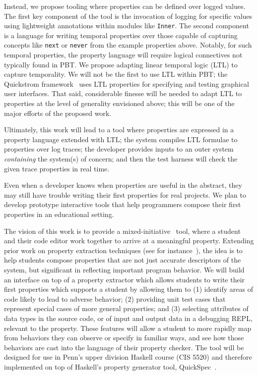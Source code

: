 Instead, we propose tooling where properties can be defined over logged values.
The first key component of the tool is the invocation of
logging for specific values using lightweight annotations within modules like
\lstinline{Inner}. The second component is a language for writing temporal
properties over those capable of capturing concepts like \lstinline{next} or
\lstinline{never} from the example properties above. Notably, for such temporal
properties, the property language will require logical connectives not typically
found in PBT. We propose adapting linear temporal logic (LTL) to capture
temporality. We will not be the first to use LTL within PBT; the Quickstrom
framework~\cite{oconnor_quickstrom_2022} uses LTL properties
for specifying and testing graphical user interfaces. That said, considerable
finesse will be needed to adapt LTL to properties at the level of generality
envisioned above; this will be one of the major efforts of the proposed work.

Ultimately, this work will lead to a tool where properties are expressed in a
property language extended with LTL; the system compiles LTL formulae to
properties over log traces; the developer provides inputs to an outer system
\emph{containing} the system(s) of concern; and then the test harness will check
the given trace properties in real time.

\iflater{}
\fi
%
Even when a developer knows when properties are useful in the abstract,
they may still have trouble writing their first properties
for real projects. We plan to develop prototype interactive tools that help
programmers compose their first properties in an educational setting.

The vision of this work is to provide a mixed-initiative~\cite{ref:allen1999mixed}
tool, where a student and their code editor work together to arrive at a
meaningful property. Extending prior work on property extraction techniques (see for
instance~\cite{ref:ammons2002mining, ref:le2018deep, ref:claessen2010quickspec,
smith_discovering_2017}), the idea is to help students compose properties that
are not just accurate descriptors of the system, but significant in reflecting
important program behavior. We will build an interface on top of a property
extractor which allows students to write their first properties which supports a
student by allowing them to (1) identify areas of code likely to lead to adverse behavior;
(2) providing unit test cases that represent special cases of more general
properties; and (3) selecting attributes of data types in the source code, or
of input and output data in a debugging REPL, relevant to the property. These
features will allow a student to more rapidly map from behaviors they can
observe or specify in familiar ways, and see how those behaviors are cast into
the language of their property checker.
%
The tool will be designed for use in Penn's upper division Haskell
course (CIS 5520) and therefore implemented on top of
Haskell's property
generator tool, QuickSpec~\cite{ref:claessen2010quickspec}.

